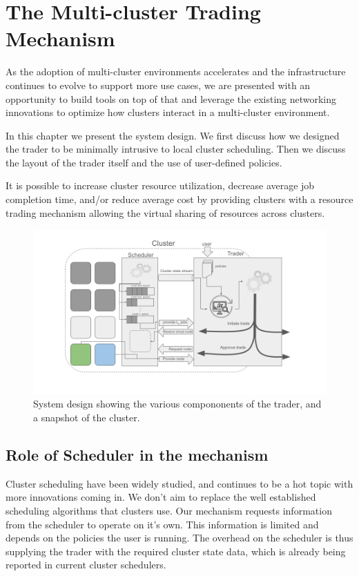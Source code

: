 
\chapter{The Multi-cluster Trading Mechanism}

As the adoption of multi-cluster environments accelerates and the
infrastructure continues to evolve to support more use cases, we are presented
with an opportunity to build tools on top of that and leverage the existing
networking innovations to optimize how clusters interact in a multi-cluster
environment. 

In this chapter we present the system design. We first discuss how we designed
the trader to be minimally intrusive to local cluster scheduling. Then we
discuss the layout of the trader itself and the use of user-defined policies. 

It is possible to increase cluster resource utilization, decrease average job
completion time, and/or reduce average cost by providing clusters with a
resource trading mechanism allowing the virtual sharing of resources across
clusters. 

\begin{figure}[H]
    \centerline{\includegraphics[scale=0.4]{figures/system-diagram}}
    \caption{System design showing the various compononents of the trader, and a snapshot of the cluster. }
\end{figure}

\section{Role of Scheduler in the mechanism}

Cluster scheduling have been widely studied, and continues to be a hot topic
with more innovations coming in. We don't aim to replace the well established
scheduling algorithms that clusters use. Our mechanism requests information
from the scheduler to operate on it's own. This information is limited and
depends on the policies the user is running. The overhead on the scheduler is
thus supplying the trader with the required cluster state data, which is
already being reported in current cluster schedulers. 

